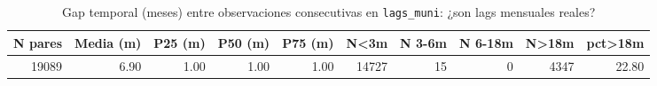 \begin{table}[ht]
\centering
\caption{Gap temporal (meses) entre observaciones consecutivas en \texttt{lags\_muni}: ¿son lags mensuales reales?} 
\label{tab:13a_lags_gap_temporal}
\begin{tabular}{rrrrrrrrrr}
  \toprule
N pares & Media (m) & P25 (m) & P50 (m) & P75 (m) & N<3m & N 3-6m & N 6-18m & N>18m & pct>18m \\ 
  \midrule
19089 & 6.90 & 1.00 & 1.00 & 1.00 & 14727 &  15 &   0 & 4347 & 22.80 \\ 
   \bottomrule
\end{tabular}
\end{table}
